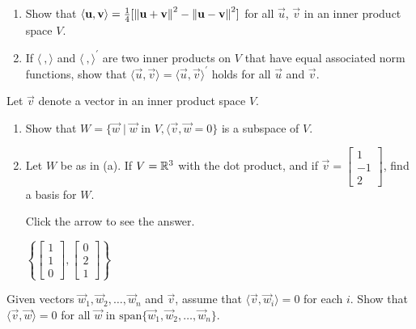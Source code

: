 \documentclass{ximera}
\begin{document}
\begin{problem}\label{prob:inner_prod_25}
\begin{enumerate} 
\item Show that $\langle \mathbf{u}, \mathbf{v} \rangle = \frac{1}{4}[\left\lVert \mathbf{u} + \mathbf{v} \right\rVert ^2 - \left\lVert \mathbf{u} - \mathbf{v} \right\rVert ^2]$ for all $\vec{u}$, $\vec{v}$ in an inner product space $V$.

\item If $\langle\ , \rangle$ and $\langle\ , \rangle^\prime$ are two inner products on $V$ that have equal associated norm functions, show that $\langle\vec{u}, \vec{v}\rangle = \langle\vec{u}, \vec{v}\rangle^\prime$ holds for all $\vec{u}$ and $\vec{v}$.

\end{enumerate}
\end{problem}

\begin{problem}\label{prob:inner_prod_26}
Let $\vec{v}$ denote a vector in an inner product space $V$.

\begin{enumerate} 
\item Show that $W = \{\vec{w} \mid \vec{w} \mbox{ in } V, \langle\vec{v}, \vec{w} = 0\}$ is a subspace of $V$.

\item Let $W$ be as in (a). If $V = \mathbb{R}^3$ with the dot product, and if $\vec{v} = \begin{bmatrix}1\\ -1\\ 2\end{bmatrix}$, find a basis for $W$.

Click the arrow to see the answer.
\begin{expandable}
$\left\{\begin{bmatrix}1\\ 1\\ 0\end{bmatrix}, \begin{bmatrix}0\\ 2\\ 1\end{bmatrix}\right\}$
\end{expandable}
\end{enumerate}
\end{problem}

\begin{problem} \label{ex:10_1_27}
Given vectors $\vec{w}_{1}, \vec{w}_{2}, \dots, \vec{w}_{n}$ and $\vec{v}$, assume that $\langle\vec{v}, \vec{w}_{i}\rangle = 0$ for each $i$. Show that $\langle\vec{v}, \vec{w}\rangle = 0$ for all $\vec{w}$ in $\mbox{span}\{\vec{w}_{1}, \vec{w}_{2}, \dots, \vec{w}_{n}\}$.
\end{problem}
\end{document}

